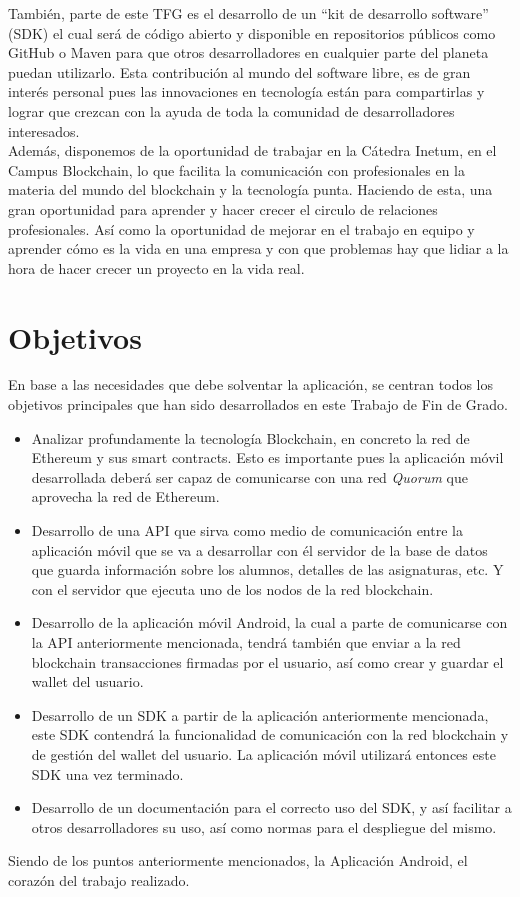 También, parte de este TFG es el desarrollo de un ``kit de desarrollo software'' (SDK) el cual será de código abierto y disponible en repositorios públicos como GitHub o Maven para que otros desarrolladores en cualquier parte del planeta puedan utilizarlo. Esta contribución al mundo del software libre, es de gran interés personal pues las innovaciones en tecnología están para compartirlas y lograr que crezcan con la ayuda de toda la comunidad de desarrolladores interesados. \\

Además, disponemos de la oportunidad de trabajar en la Cátedra Inetum, en el Campus Blockchain, lo que facilita la comunicación con profesionales en la materia del mundo del blockchain y la tecnología punta. Haciendo de esta, una gran oportunidad para aprender y hacer crecer el circulo de relaciones profesionales. Así como la oportunidad de mejorar en el trabajo en equipo y aprender cómo es la vida en una empresa y con que problemas hay que lidiar a la hora de hacer crecer un proyecto en la vida real.

\section{Objetivos}

En base a las necesidades que debe solventar la aplicación, se centran todos los objetivos principales que han sido desarrollados en este Trabajo de Fin de Grado.
\begin{itemize}
\item Analizar profundamente la tecnología Blockchain, en concreto la red de Ethereum y sus smart contracts. Esto es importante pues la aplicación móvil desarrollada deberá ser capaz de comunicarse con una red \emph{Quorum} que aprovecha la red de Ethereum.
\item Desarrollo de una API que sirva como medio de comunicación entre la aplicación móvil que se va a desarrollar con él servidor de la base de datos que guarda información sobre los alumnos, detalles de las asignaturas, etc. Y con el servidor que ejecuta uno de los nodos de la red blockchain. 
\item Desarrollo de la aplicación móvil Android, la cual a parte de comunicarse con la API anteriormente mencionada, tendrá también que enviar a la red blockchain transacciones firmadas por el usuario, así como crear y guardar el wallet del usuario. 
\item Desarrollo de un SDK a partir de la aplicación anteriormente mencionada, este SDK contendrá la funcionalidad de comunicación con la red blockchain y de gestión del wallet del usuario. La aplicación móvil utilizará entonces este SDK una vez terminado. 
\item Desarrollo de un documentación para el correcto uso del SDK, y así facilitar a otros desarrolladores su uso, así como normas para el despliegue del mismo. 
\end{itemize}
Siendo de los puntos anteriormente mencionados, la Aplicación Android, el corazón del trabajo realizado.

